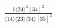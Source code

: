 \documentclass[varwidth, border=5pt]{standalone}
\begin{document}
\begin{my}
$\begin{gathered}
\scriptscriptstyle\frac{1⟨24⟩^2[34]^2}{⟨14⟩⟨23⟩⟨34⟩[35]^2}
\end{gathered}$
\end{my}
\end{document}
